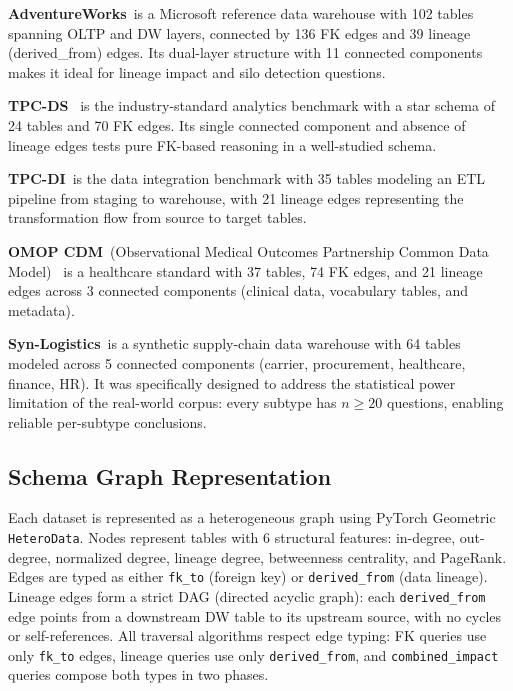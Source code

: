 \textbf{AdventureWorks}~is a Microsoft reference data warehouse with 102
tables spanning OLTP and DW layers, connected by 136 FK edges and 39
lineage (derived\_from) edges.  Its dual-layer structure with 11 connected
components makes it ideal for lineage impact and silo detection questions.

\textbf{TPC-DS}~\cite{tpcds2021} is the industry-standard analytics benchmark with a star
schema of 24 tables and 70 FK edges.  Its single connected component and
absence of lineage edges tests pure FK-based reasoning in a well-studied
schema.

\textbf{TPC-DI}~is the data integration benchmark with 35 tables modeling
an ETL pipeline from staging to warehouse, with 21 lineage edges
representing the transformation flow from source to target tables.

\textbf{OMOP CDM}~(Observational Medical Outcomes Partnership Common Data
Model)~\cite{ohdsi2019omop} is a healthcare standard with 37 tables, 74
FK edges, and 21 lineage edges across 3 connected components (clinical
data, vocabulary tables, and metadata).

\textbf{Syn-Logistics}~is a synthetic supply-chain data warehouse with 64
tables modeled across 5 connected components (carrier, procurement,
healthcare, finance, HR).  It was specifically designed to address the
statistical power limitation of the real-world corpus: every subtype has
$n\geq20$ questions, enabling reliable per-subtype conclusions.

\subsection{Schema Graph Representation}

Each dataset is represented as a heterogeneous graph using PyTorch
Geometric~\cite{fey2019pyg} \texttt{HeteroData}.  Nodes represent
tables with 6 structural features: in-degree, out-degree, normalized
degree, lineage degree, betweenness centrality, and PageRank.  Edges are
typed as either \texttt{fk\_to} (foreign key) or \texttt{derived\_from}
(data lineage).  Lineage edges form a strict DAG (directed acyclic graph):
each \texttt{derived\_from} edge points from a downstream DW table to its
upstream source, with no cycles or self-references.  All traversal
algorithms respect edge typing: FK queries use only \texttt{fk\_to}
edges, lineage queries use only \texttt{derived\_from}, and
\texttt{combined\_impact} queries compose both types in two phases.


